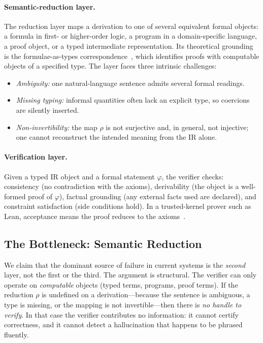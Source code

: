 \documentclass[11pt]{article}
\theoremstyle{definition}
\theoremstyle{plain}
\theoremstyle{remark}
\begin{document}
\paragraph{Semantic-reduction layer.}
The reduction layer maps a derivation to one of several equivalent formal objects: a formula in
first- or higher-order logic, a program in a domain-specific language, a proof object, or a
typed intermediate representation. Its theoretical grounding is the formulae-as-types
correspondence~\cite{howard1980}, which identifies proofs with computable objects of a
specified type. The layer faces three intrinsic challenges:
\begin{itemize}[leftmargin=1.5em]
  \item \emph{Ambiguity:} one natural-language sentence admits several formal readings.
  \item \emph{Missing typing:} informal quantities often lack an explicit type, so coercions
        are silently inserted.
  \item \emph{Non-invertibility:} the map $\rho$ is not surjective and, in general, not
        injective; one cannot reconstruct the intended meaning from the IR alone.
\end{itemize}

\paragraph{Verification layer.}
Given a typed IR object and a formal statement $\varphi$, the verifier checks: consistency
(no contradiction with the axioms), derivability (the object is a well-formed proof of
$\varphi$), factual grounding (any external facts used are declared), and constraint
satisfaction (side conditions hold). In a trusted-kernel prover such as Lean, acceptance means
the proof reduces to the axioms~\cite{demoura2015,demoura2021}.

\subsection{The Bottleneck: Semantic Reduction}
We claim that the dominant source of failure in current systems is the \emph{second} layer, not
the first or the third. The argument is structural. The verifier can only operate on
\emph{computable} objects (typed terms, programs, proof terms). If the reduction $\rho$ is
undefined on a derivation---because the sentence is ambiguous, a type is missing, or the
mapping is not invertible---then there is \emph{no handle to verify}. In that case the
verifier contributes no information: it cannot certify correctness, and it cannot detect a
hallucination that happens to be phrased fluently.
\end{document}
